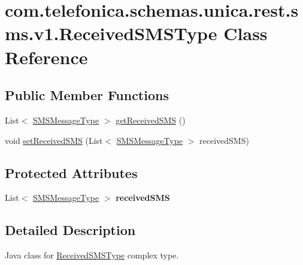 \hypertarget{classcom_1_1telefonica_1_1schemas_1_1unica_1_1rest_1_1sms_1_1v1_1_1ReceivedSMSType}{
\section{com.telefonica.schemas.unica.rest.sms.v1.ReceivedSMSType Class Reference}
\label{classcom_1_1telefonica_1_1schemas_1_1unica_1_1rest_1_1sms_1_1v1_1_1ReceivedSMSType}
}
\subsection*{Public Member Functions}
\begin{DoxyCompactItemize}
\item 
List$<$ \hyperlink{classcom_1_1telefonica_1_1schemas_1_1unica_1_1rest_1_1sms_1_1v1_1_1SMSMessageType}{SMSMessageType} $>$ \hyperlink{classcom_1_1telefonica_1_1schemas_1_1unica_1_1rest_1_1sms_1_1v1_1_1ReceivedSMSType_aeca32134d459b32a0d734214b439b1a7}{getReceivedSMS} ()
\item 
void \hyperlink{classcom_1_1telefonica_1_1schemas_1_1unica_1_1rest_1_1sms_1_1v1_1_1ReceivedSMSType_ac5bb91f5a0cbdbfb74493fa151d7388b}{setReceivedSMS} (List$<$ \hyperlink{classcom_1_1telefonica_1_1schemas_1_1unica_1_1rest_1_1sms_1_1v1_1_1SMSMessageType}{SMSMessageType} $>$ receivedSMS)
\end{DoxyCompactItemize}
\subsection*{Protected Attributes}
\begin{DoxyCompactItemize}
\item 
\hypertarget{classcom_1_1telefonica_1_1schemas_1_1unica_1_1rest_1_1sms_1_1v1_1_1ReceivedSMSType_a031a03ead5fbfa397cf8cb41dfbb5041}{
List$<$ \hyperlink{classcom_1_1telefonica_1_1schemas_1_1unica_1_1rest_1_1sms_1_1v1_1_1SMSMessageType}{SMSMessageType} $>$ {\bfseries receivedSMS}}
\label{classcom_1_1telefonica_1_1schemas_1_1unica_1_1rest_1_1sms_1_1v1_1_1ReceivedSMSType_a031a03ead5fbfa397cf8cb41dfbb5041}

\end{DoxyCompactItemize}


\subsection{Detailed Description}
Java class for \hyperlink{classcom_1_1telefonica_1_1schemas_1_1unica_1_1rest_1_1sms_1_1v1_1_1ReceivedSMSType}{ReceivedSMSType} complex type.

